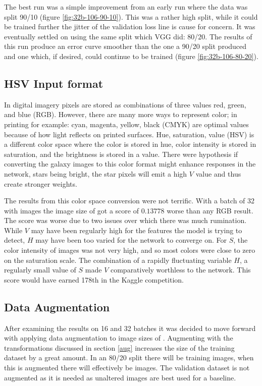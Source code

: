 The best run was a simple improvement from an early run where the data was split 90/10 (figure \ref{fig:32b-106-90-10}). This was a rather high split, while it could be trained further the jitter of the validation loss line is cause for concern. It was eventually settled on using the same split which VGG did: 80/20. The results of this run produce an error curve smoother than the one a 90/20 split produced and one which, if desired, could continue to be trained (figure \ref{fig:32b-106-80-20}).

\subsection{HSV Input format}

In digital imagery pixels are stored as combinations of three values red, green, and blue (RGB). However, there are many more ways to represent color; in printing for example: cyan, magenta, yellow, black (CMYK) are optimal values because of how light reflects on printed surfaces. Hue, saturation, value (HSV) is a different color space where the color is stored in hue, color intensity is stored in saturation, and the brightness is stored in a value. There were hypothesis if converting the galaxy images to this color format might enhance responses in the network, stars being bright, the star pixels will emit a high $V$ value and thus create stronger weights.

The results from this color space conversion were not terrific. With a batch of 32 with images the image size of  got a score of $0.13778$ worse than any RGB result. The score was worse due to two issues over which there was much rumination. While $V$ may have been regularly high for the features the model is trying to detect, $H$ may have been too varied for the network to converge on. For $S$, the color intensity of images was not very high, and so most colors were close to zero on the saturation scale. The combination of a rapidly fluctuating variable $H$, a regularly small value of $S$ made $V$ comparatively worthless to the network. This score would have earned 178th in the Kaggle competition.

\subsection{Data Augmentation}
After examining the results on 16 and 32 batches it was decided to move forward with applying data augmentation to image sizes of . Augmenting with the transformations discussed in section \ref{aug} increases the size of the training dataset by a great amount. In an 80/20 split there will be  training images, when this is augmented there will effectively be  images. The validation dataset is not augmented as it is needed as unaltered images are best used for a baseline.

